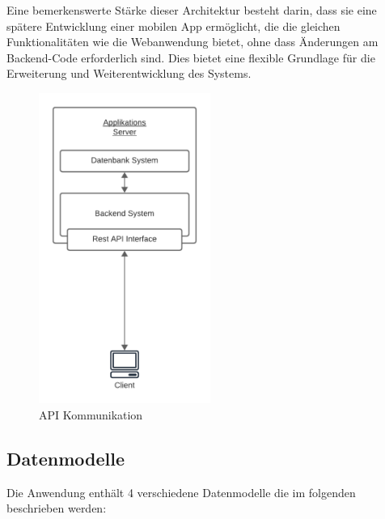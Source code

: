 \noindent Eine bemerkenswerte Stärke dieser Architektur besteht darin, dass sie eine spätere 
Entwicklung einer mobilen App ermöglicht, die die gleichen Funktionalitäten wie die 
Webanwendung bietet, ohne dass Änderungen am Backend-Code erforderlich sind. 
Dies bietet eine flexible Grundlage für die Erweiterung und Weiterentwicklung des Systems.\newline

\begin{figure}[H]
  \centering
  \includegraphics[width=0.5\textwidth]{img/API Kommunikation.png}
  \caption{API Kommunikation}
\end{figure}

\subsection{Datenmodelle}

Die Anwendung enthält 4 verschiedene Datenmodelle die im folgenden beschrieben werden:

